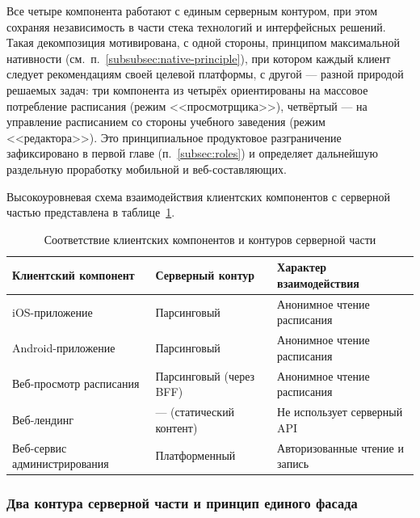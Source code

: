 Все четыре компонента работают с единым серверным контуром, при этом сохраняя независимость в части стека технологий и интерфейсных решений. Такая декомпозиция мотивирована, с одной стороны, принципом максимальной нативности (см.~п.~\ref{subsubsec:native-principle}), при котором каждый клиент следует рекомендациям своей целевой платформы, с другой --- разной природой решаемых задач: три компонента из четырёх ориентированы на массовое потребление расписания (режим <<просмотрщика>>), четвёртый --- на управление расписанием со стороны учебного заведения (режим <<редактора>>). Это принципиальное продуктовое разграничение зафиксировано в первой главе (п.~\ref{subsec:roles}) и определяет дальнейшую раздельную проработку мобильной и веб-составляющих.

Высокоуровневая схема взаимодействия клиентских компонентов с серверной частью представлена в таблице~\ref{tab:components-backends}.

\begin{table}[h]
  \caption{Соответствие клиентских компонентов и контуров серверной части}
  \label{tab:components-backends}
  \centering
  \small
  \begin{tabular}{p{} p{} p{}}
    \toprule
    Клиентский компонент & Серверный контур & Характер взаимодействия \\
    \midrule
    iOS-приложение      & Парсинговый                & Анонимное чтение расписания \\
    Android-приложение  & Парсинговый                & Анонимное чтение расписания \\
    Веб-просмотр расписания & Парсинговый (через BFF) & Анонимное чтение расписания \\
    Веб-лендинг         & --- (статический контент)  & Не использует серверный API \\
    Веб-сервис администрирования & Платформенный   & Авторизованные чтение и запись \\
    \bottomrule
  \end{tabular}
\end{table}

\subsubsection{Два контура серверной части и принцип единого фасада}
\label{subsubsec:two-backends}

